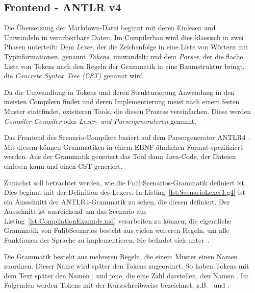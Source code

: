\subsection{Frontend - ANTLR v4}\label{subsec:frontend-antlr4}

Die Übersetzung der Markdown-Datei beginnt mit deren Einlesen und Umwandeln in verarbeitbare Daten.
Im Compilerbau wird dies klassisch in zwei Phasen unterteilt:
Dem \emph{Lexer}, der die Zeichenfolge in eine Liste von Wörtern mit Typinformationen, genannt \emph{Tokens}, umwandelt;
und dem \emph{Parser}, der die flache Liste von Tokens nach den Regeln der Grammatik in eine Baumstruktur bringt,
die \emph{Concrete Syntax Tree (CST)} genannt wird.

Da die Umwandlung in Tokens und deren Strukturierung Anwendung in den meisten Compilern findet
und deren Implementierung meist nach einem festen Muster stattfindet,
existieren Tools, die diesen Prozess vereinfachen.
Diese werden \emph{Compiler-Compiler} oder \emph{Lexer- und Parsergeneratoren} genannt.

Das Frontend des Scenario-Compilers basiert auf dem Parsergenerator ANTLR4~\cite{antlr4-reference}.
Mit diesem können Grammatiken in einem EBNF-ähnlichen Format spezifiziert werden.
Aus der Grammatik generiert das Tool dann Java-Code, der Dateien einlesen kann und einen CST generiert.

Zunächst soll betrachtet werden, wie die FulibScenarios-Grammatik definiert ist.
Dies beginnt mit der Definition des Lexers.
In Listing~\ref{lst:ScenarioLexer1.g4} ist ein Ausschnitt der ANTLR4-Grammatik zu sehen, die diesen definiert.
Der Ausschnitt ist ausreichend um das Scenario aus Listing~\ref{lst:CompilationExample.md} verarbeiten zu können;
die eigentliche Grammatik von FulibScenarios besteht aus vielen weiteren Regeln, um alle Funktionen der Sprache zu implementieren.
Sie befindet sich unter~\cite{lexer-grammar}.


Die Grammatik besteht aus mehreren Regeln, die einem Muster einen Namen zuordnen.
Dieser Name wird später den Tokens zugeordnet.
So haben Tokens mit dem Text  später den Namen ;
und jene, die eine Zahl darstellen, den Namen .
Im Folgenden werden Tokens mit der Kurzschreibweise  bezeichnet,
z.B.\  und .


